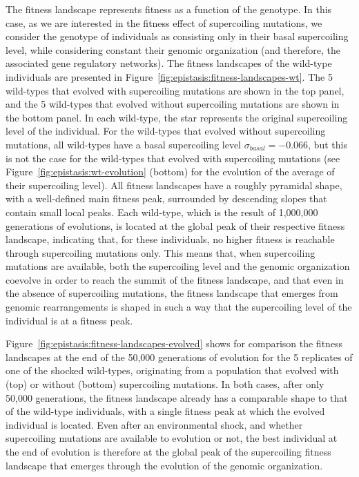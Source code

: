 The fitness landscape represents fitness as a function of the genotype.
In this case, as we are interested in the fitness effect of supercoiling mutations, we consider the genotype of individuals as consisting only in their basal supercoiling level, while considering constant their genomic organization (and therefore, the associated gene regulatory networks).
The fitness landscapes of the wild-type individuals are presented in Figure~\ref{fig:epistasis:fitness-landscapes-wt}.
The 5 wild-types that evolved with supercoiling mutations are shown in the top panel, and the 5 wild-types that evolved without supercoiling mutations are shown in the bottom panel.
In each wild-type, the star represents the original supercoiling level of the individual.
For the wild-types that evolved without supercoiling mutations, all wild-types have a basal supercoiling level $\sigma_{basal} = -0.066$, but this is not the case for the wild-types that evolved with supercoiling mutations (see Figure~\ref{fig:epistasis:wt-evolution} (bottom) for the evolution of the average of their supercoiling level).
All fitness landscapes have a roughly pyramidal shape, with a well-defined main fitness peak, surrounded by descending slopes that contain small local peaks.
Each wild-type, which is the result of 1,000,000 generations of evolutions, is located at the global peak of their respective fitness landscape, indicating that, for these individuals, no higher fitness is reachable through supercoiling mutations only.
This means that, when supercoiling mutations are available, both the supercoiling level and the genomic organization coevolve in order to reach the summit of the fitness landscape, and that even in the absence of supercoiling mutations, the fitness landscape that emerges from genomic rearrangements is shaped in such a way that the supercoiling level of the individual is at a fitness peak.

Figure~\ref{fig:epistasis:fitness-landscapes-evolved} shows for comparison the fitness landscapes at the end of the 50,000 generations of evolution for the 5 replicates of one of the shocked wild-types, originating from a population that evolved with (top) or without (bottom) supercoiling mutations.
In both cases, after only 50,000 generations, the fitness landscape already has a comparable shape to that of the wild-type individuals, with a single fitness peak at which the evolved individual is located.
Even after an environmental shock, and whether supercoiling mutations are available to evolution or not, the best individual at the end of evolution is therefore at the global peak of the supercoiling fitness landscape that emerges through the evolution of the genomic organization.

